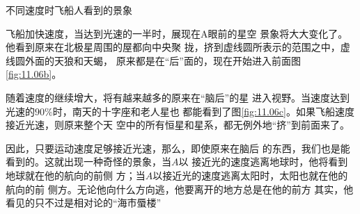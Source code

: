 \begin{figurex}
    \centering
    \caption{不同速度时飞船人看到的景象}
    \label{fig:11.06}
\end{figurex}

飞船加快速度，当达到光速的一半时，展现在A眼前的星空
景象将大大变化了。他看到原来在北极星周围的屋都向中央聚
拢，挤到虚线圆所表示的范围之中，虚线圆外面的天狼和天蝎，
原来都是在“后”面的，现在开始进入前面\lhbrak 图\ref{fig:11.06b}\rhbrak 。

随着速度的继续增大，将有越来越多的原来在“脑后”的星
进入视野。当速度达到光速的$ 90\% $时，南天的十字座和老人星也
都能看到了\lhbrak 图\ref{fig:11.06c}\rhbrak 。如果飞船速度接近光速，则原来整个天
空中的所有恒星和星系，都无例外地“挤”到前面来了。

因此，只要运动速度足够接近光速，那么，即使原来在脑后
的东西，我们也是能看到的。这就出现一种奇怪的景象，当$ A $以
接近光的速度逃离地球时，他将看到地球就在他的航向的前侧
方；当$ A $以接近光的速度逃离太阳时，太阳也就在他的航向的前
侧方。无论他向什么方向逃，他要离开的地方总是在他的前方
其实，他看见的只不过是相对论的“海市蜃楼”
